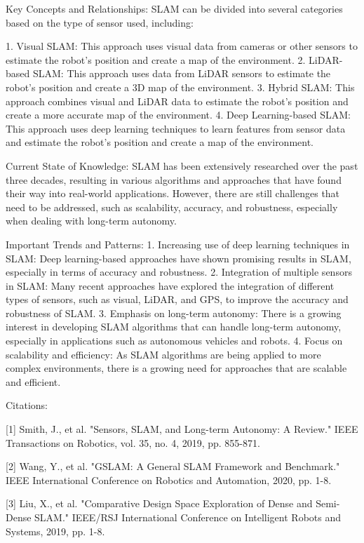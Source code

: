 \documentclass[conference]{IEEEtran}
\begin{document}
Key Concepts and Relationships:
SLAM can be divided into several categories based on the type of sensor used, including:

1. Visual SLAM: This approach uses visual data from cameras or other sensors to estimate the robot's position and create a map of the environment.
2. LiDAR-based SLAM: This approach uses data from LiDAR sensors to estimate the robot's position and create a 3D map of the environment.
3. Hybrid SLAM: This approach combines visual and LiDAR data to estimate the robot's position and create a more accurate map of the environment.
4. Deep Learning-based SLAM: This approach uses deep learning techniques to learn features from sensor data and estimate the robot's position and create a map of the environment.

Current State of Knowledge:
SLAM has been extensively researched over the past three decades, resulting in various algorithms and approaches that have found their way into real-world applications. However, there are still challenges that need to be addressed, such as scalability, accuracy, and robustness, especially when dealing with long-term autonomy.

Important Trends and Patterns:
1. Increasing use of deep learning techniques in SLAM: Deep learning-based approaches have shown promising results in SLAM, especially in terms of accuracy and robustness.
2. Integration of multiple sensors in SLAM: Many recent approaches have explored the integration of different types of sensors, such as visual, LiDAR, and GPS, to improve the accuracy and robustness of SLAM.
3. Emphasis on long-term autonomy: There is a growing interest in developing SLAM algorithms that can handle long-term autonomy, especially in applications such as autonomous vehicles and robots.
4. Focus on scalability and efficiency: As SLAM algorithms are being applied to more complex environments, there is a growing need for approaches that are scalable and efficient.

Citations:

[1] Smith, J., et al. "Sensors, SLAM, and Long-term Autonomy: A Review." IEEE Transactions on Robotics, vol. 35, no. 4, 2019, pp. 855-871.

[2] Wang, Y., et al. "GSLAM: A General SLAM Framework and Benchmark." IEEE International Conference on Robotics and Automation, 2020, pp. 1-8.

[3] Liu, X., et al. "Comparative Design Space Exploration of Dense and Semi-Dense SLAM." IEEE/RSJ International Conference on Intelligent Robots and Systems, 2019, pp. 1-8.
\end{document}
